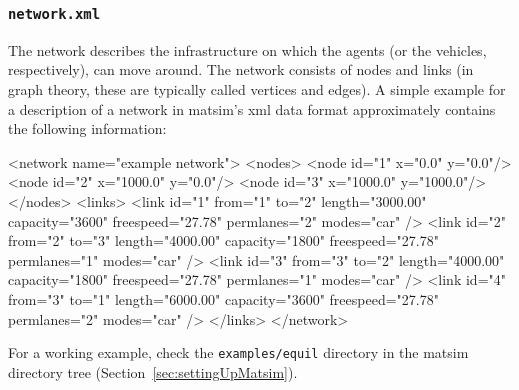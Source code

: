 \subsubsection{\lstinline{network.xml}}
\label{sec:lgstarted-network-file}
The network describes the infrastructure on which the agents (or the vehicles, respectively), can move around. The network consists of \glspl{node} and \glspl{link} (in graph theory, these are typically called vertices and edges). A simple example for a description of a network in \gls{matsim}'s \gls{xml} data format 
approximately contains the following information:
\begin{xml}
<network name="example network"> 
   <nodes> 
      <node id="1" x="0.0" y="0.0"/> 
      <node id="2" x="1000.0" y="0.0"/> 
      <node id="3" x="1000.0" y="1000.0"/> 
   </nodes> 
   <links> 
      <link id="1" from="1" to="2" length="3000.00" capacity="3600" 
            freespeed="27.78" permlanes="2" modes="car" /> 
      <link id="2" from="2" to="3" length="4000.00" capacity="1800" 
            freespeed="27.78" permlanes="1" modes="car" /> 
      <link id="3" from="3" to="2" length="4000.00" capacity="1800" 
            freespeed="27.78" permlanes="1" modes="car" /> 
      <link id="4" from="3" to="1" length="6000.00" capacity="3600" 
            freespeed="27.78" permlanes="2" modes="car" /> 
   </links> 
</network>
\end{xml}
For a working example, check the \lstinline{examples/equil} directory in the \gls{matsim} directory tree (\cf Section~\ref{sec:settingUpMatsim}).

